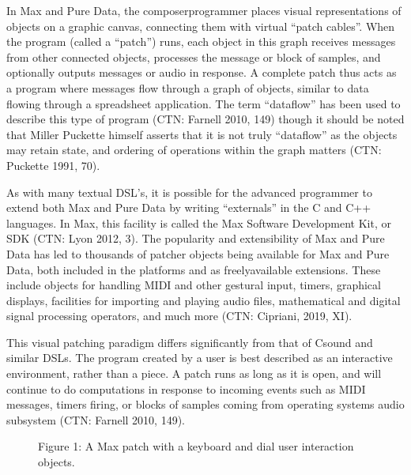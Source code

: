 \documentclass[letterpaper,10pt,english]{sphinxmanual}
\begin{document}
\sphinxAtStartPar
In Max and Pure Data, the composer\sphinxhyphen{}programmer places visual representations of objects on a graphic canvas,
connecting them with virtual “patch cables”. When the program (called a “patch”) runs,
each object in this graph receives messages from other connected objects, processes the
message or block of samples, and optionally outputs messages or audio in response.
A complete patch thus acts as a program where messages flow
through a graph of objects, similar to data flowing through a spreadsheet application.
The term “dataflow” has been used to describe this type of program (CTN: Farnell 2010, 149)
though it should be noted that Miller Puckette himself asserts that it is not
truly “dataflow” as the objects may retain state, and ordering of operations within the graph
matters (CTN: Puckette 1991, 70).

\sphinxAtStartPar
As with many textual DSL’s, it is possible for the advanced programmer to extend both Max
and Pure Data by writing “externals” in the C and C++ languages. In Max, this facility
is called the Max Software Development Kit, or SDK (CTN: Lyon 2012, 3).
The popularity and extensibility of Max and Pure Data has led to thousands
of patcher objects being available for Max and Pure Data, both included
in the platforms and as freely\sphinxhyphen{}available extensions. These include objects
for handling MIDI and other gestural input, timers, graphical displays,
facilities for importing and playing audio files, mathematical
and digital signal processing operators, and much more (CTN: Cipriani, 2019, XI).

\sphinxAtStartPar
This visual patching paradigm differs significantly from that of Csound and similar DSLs.
The program created by a user is best described as an interactive environment, rather than a piece.
A patch runs as long as it is open, and will continue to do computations in response to
incoming events such as MIDI messages, timers firing, or blocks of samples
coming from operating systems audio subsystem (CTN: Farnell 2010, 149).

\begin{figure}[htbp]
\centering
\capstart

\noindent{}
\caption{Figure 1: A Max patch with a keyboard and dial user interaction objects.}\label{\detokenize{background:id1}}\end{figure}
\end{document}
